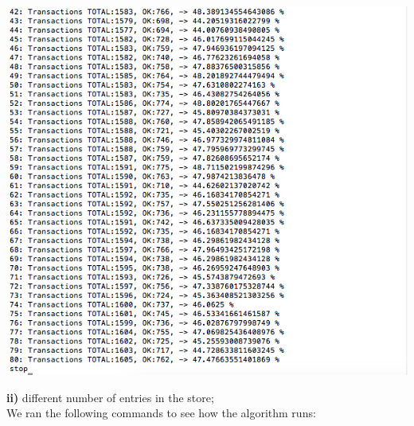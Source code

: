 \documentclass[a4paper, 11pt]{article}
\begin{document}
\begin{itemize}
\includegraphics[scale=0.5]{images/exp-i-6b.png} \\
\end{itemize}
%
\textbf{ii)} different number of entries in the store;\\
We ran the following commands to see how the algorithm runs:\\
\end{document}
